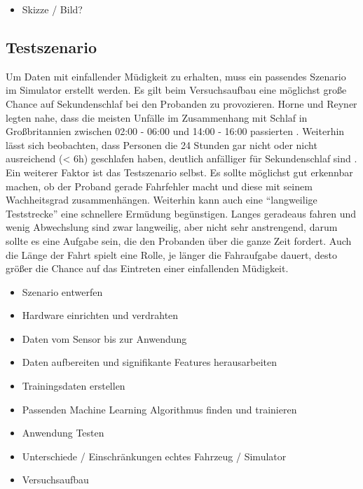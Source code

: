 {\begin{itemize}
	\item Skizze / Bild?
\end{itemize}

\subsection{Testszenario}
Um Daten mit einfallender Müdigkeit zu erhalten, muss ein passendes Szenario im Simulator erstellt werden. Es gilt beim Versuchsaufbau eine möglichst große Chance auf Sekundenschlaf bei den Probanden zu provozieren. Horne und Reyner legten nahe, dass die meisten Unfälle im Zusammenhang mit Schlaf in Großbritannien zwischen 02:00 - 06:00 und 14:00 - 16:00 passierten \cite{Horne_1757738}. Weiterhin lässt sich beobachten, dass Personen die 24 Stunden gar nicht oder nicht ausreichend (< 6h) geschlafen haben, deutlich anfälliger für Sekundenschlaf sind \cite{Peters_1}. 
Ein weiterer Faktor ist das Testszenario selbst. Es sollte möglichst gut erkennbar machen, ob der Proband gerade Fahrfehler macht und diese mit seinem Wachheitsgrad zusammenhängen. Weiterhin kann auch eine "`langweilige Teststrecke"' eine schnellere Ermüdung begünstigen. Langes geradeaus fahren und wenig Abwechslung sind zwar langweilig, aber nicht sehr anstrengend, darum sollte es eine Aufgabe sein, die den Probanden über die ganze Zeit fordert. Auch die Länge der Fahrt spielt eine Rolle, je länger die Fahraufgabe dauert, desto größer die Chance auf das Eintreten einer einfallenden Müdigkeit.


\begin{itemize}
  \item Szenario entwerfen
  \item Hardware einrichten und verdrahten
  \item Daten vom Sensor bis zur Anwendung
  \item Daten aufbereiten und signifikante Features herausarbeiten
  \item Trainingsdaten erstellen
  \item Passenden Machine Learning Algorithmus finden und trainieren
  \item Anwendung Testen
\end{itemize}

\begin{itemize}
  \item Unterschiede / Einschränkungen echtes Fahrzeug / Simulator
  \item Versuchsaufbau
\end{itemize}


}
